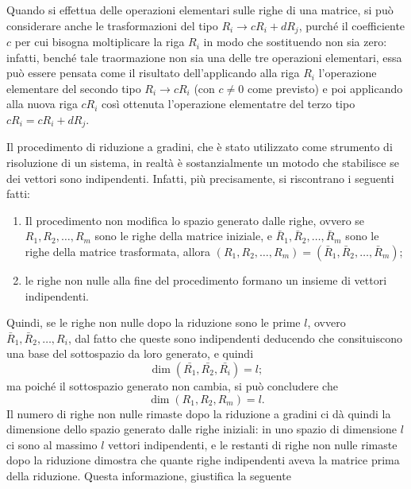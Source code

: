 \begin{oss}
  \label{oss:guess-jorda1}
  Quando si effettua delle operazioni elementari sulle righe di una
  matrice, si può considerare anche le trasformazioni del tipo $R_i\to
  cR_i+dR_{j}$, purché il coefficiente $c$ per cui bisogna moltiplicare
  la riga $R_i$ in modo che sostituendo non sia zero: infatti, benché
  tale traormazione non sia una delle tre operazioni elementari, essa
  può essere pensata come il risultato dell'applicando alla riga $R_i$
  l'operazione elementare del secondo tipo $R_i\to cR_i$ (con $c\neq 0$
  come previsto) e poi applicando alla nuova riga $cR_i$ così ottenuta
  l'operazione elementatre del terzo tipo $cR_i=cR_i+dR_j$.
\end{oss}
Il procedimento di riduzione a gradini, che è stato utilizzato come
strumento di risoluzione di un sistema, in realtà è sostanzialmente un
motodo che stabilisce se dei vettori sono indipendenti. Infatti, più
precisamente, si riscontrano i seguenti fatti:
\begin{enumerate}
\item Il procedimento non modifica lo spazio generato dalle righe, ovvero
  se $R_1,R_2,\dots,R_m$ sono le righe della matrice iniziale, e
  $\bar{R}_1,\bar{R}_2,\dots,\bar{R}_m$ sono le righe della matrice
  trasformata, allora $(R_1,R_2,\dots,R_m)=(\bar{R}_1,\bar{R}_2,\dots,
  \bar{R}_m)$;
\item le righe non nulle alla fine del procedimento formano un insieme di
  vettori indipendenti.
\end{enumerate}
Quindi, se le righe non nulle dopo la riduzione sono le prime $l$, ovvero
$\bar{R}_1,\bar{R}_2,\dots,R_i$, dal fatto che queste sono indipendenti
deducendo che consituiscono una base del sottospazio da loro generato, e
quindi
\begin{equation*}
  \dim(\bar{R_1},\bar{R_2},\bar{R_i})=l;
\end{equation*}
ma poiché il sottospazio generato non cambia, si può concludere che
\begin{equation*}
  \dim(R_1,R_2,R_m)=l.
\end{equation*}
Il numero di righe non nulle rimaste dopo la riduzione a gradini ci dà
quindi la dimensione dello spazio generato dalle righe iniziali: in uno
spazio di dimensione $l$ ci sono al massimo $l$ vettori indipendenti, e
le restanti di righe non nulle rimaste dopo la riduzione dimostra che
quante righe indipendenti  aveva la matrice prima della riduzione. Questa
informazione, giustifica la seguente
